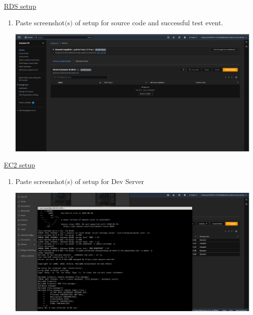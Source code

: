 \documentclass[11pt]{article}
\begin{document}
\newpage
\noindent\underline{RDS setup}    
\begin{enumerate}[resume]    
    \item Paste screenshot$($s$)$  of setup for source code and successful test event. \\
    \vspace{5mm}

    {\centering
    \includegraphics[width=5.8in]{pics/32.png}
    }


\end{enumerate}


\vspace{1cm}

\newpage

\noindent\underline{EC2 setup}
\begin{enumerate}[resume]
    \item Paste screenshot$($s$)$ of setup for Dev Server \\ 
    \vspace{5mm}

    {\centering
    \includegraphics[width=5.8in]{pics/36a.png}
    }
\end{enumerate}

\vspace{0.2cm}
\end{document}
